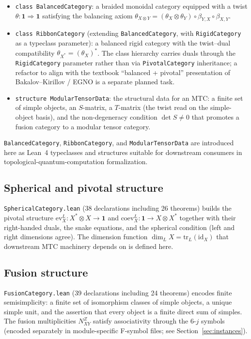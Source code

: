 \documentclass[11pt]{article}
\begin{document}
\begin{itemize}
\item \texttt{class BalancedCategory}: a braided monoidal
category equipped with a twist
$\theta : \mathbf{1} \Rightarrow \mathbf{1}$ satisfying the
balancing axiom
$\theta_{X \otimes Y} = (\theta_X \otimes \theta_Y) \circ
\beta_{Y, X} \circ \beta_{X, Y}$.
\item \texttt{class RibbonCategory} (extending
\texttt{BalancedCategory}, with \texttt{RigidCategory} as a
typeclass parameter): a balanced rigid category with the
twist--dual compatibility $\theta_{X^*} = (\theta_X)^*$. The class
hierarchy carries duals through the \texttt{RigidCategory}
parameter rather than via \texttt{PivotalCategory} inheritance; a
refactor to align with the textbook ``balanced + pivotal''
presentation of Bakalov--Kirillov / EGNO is a separate planned task.
\item \texttt{structure ModularTensorData}: the structural data
for an MTC: a finite set of simple objects, an $S$-matrix, a
$T$-matrix (the twist read on the simple-object basis), and the
non-degeneracy condition $\det S \neq 0$ that promotes a fusion
category to a modular tensor category.
\end{itemize}

\texttt{BalancedCategory}, \texttt{RibbonCategory}, and
\texttt{ModularTensorData} are introduced here as Lean~4
typeclasses and structures suitable for downstream consumers in
topological-quantum-computation formalization.

\subsection{Spherical and pivotal structure}

\texttt{SphericalCategory.lean} (38 declarations including
26 theorems) builds the pivotal structure
$\mathrm{ev}_X^L : X^* \otimes X \to \mathbf{1}$ and
$\mathrm{coev}_X^L : \mathbf{1} \to X \otimes X^*$ together with
their right-handed duals, the snake equations, and the spherical
condition (left and right dimensions agree). The dimension function
$\dim_L X = \mathrm{tr}_L(\mathrm{id}_X)$ that downstream MTC
machinery depends on is defined here.

\subsection{Fusion structure}

\texttt{FusionCategory.lean} (39 declarations including 24 theorems)
encodes finite semisimplicity: a finite set of isomorphism classes
of simple objects, a unique simple unit, and the assertion that
every object is a finite direct sum of simples. The fusion
multiplicities $N_{XY}^Z$ satisfy associativity through the
6-$j$ symbols (encoded separately in module-specific F-symbol
files; see Section~\ref{sec:instances}).
\end{document}
